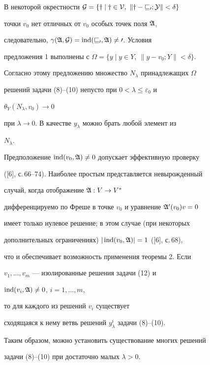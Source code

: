  


\begin{pf} 


В некоторой окрестности $\cal G=\{y\mid y\in V,\ \|y-v_0;Y\|<\delta\}$ 


точки $v_0$ нет отличных от $v_0$ особых точек поля $\frak A$, 


следовательно, $\gamma(\frak A,\cal G)=\operatorname{ind}(v_0,\frak A)\ne0$. Условия 


предложения 1 выполнены с $\Omega=\{y\mid y\in Y,\ \|y-v_0;Y\|<\delta\}$. 


Согласно этому предложению множество $N_\lambda$ принадлежащих $\Omega$ 


решений задачи (8)--(10) непусто при $0<\lambda\le\varepsilon_0$ и 


$\theta_Y(N_\lambda,v_0)\to0$ 


при $\lambda\to0$. В качестве $y_\lambda$ можно брать любой элемент из 


$N_\lambda$. 


\end{pf} 


 


Предположение $\operatorname{ind}(v_0,\frak A)\ne0$ допускает эффективную проверку 


([6], с.\,66--74). Наиболее простым представляется невырожденный 


случай, когда отображение $\frak A:V\to V^*$ 


дифференцируемо по Фреше в точке $v_0$ и уравнение $\frak A'(v_0)v=0$ 


имеет только нулевое решение; в этом случае (при некоторых 


дополнительных ограничениях) $|\operatorname{ind}(v_0,\frak A)|=1$ ([6], с.\,68), 


что и обеспечивает возможность применения теоремы 2. Если 


$v_1,\dotsc,v_m$ --- изолированные решения задачи (12) и 


$\operatorname{ind}(v_i,\frak A)\ne0$, $i=1,\dotsc,m$, 


то для каждого из решений $v_i$ существует 


сходящаяся к нему ветвь решений $y^i_\lambda$ задачи (8)--(10). 


Таким образом, можно установить существование многих решений 


задачи (8)--(10) при достаточно малых $\lambda>0$. 


 


